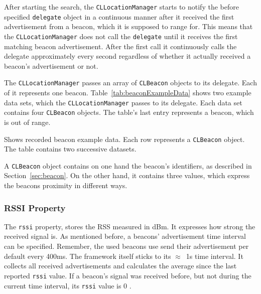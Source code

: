After starting the search, the \texttt{CLLocationManager} starts to notify the before specified \texttt{delegate} object in a continuous manner after it received the first advertisement from a beacon, which it is supposed to range for. This means that the \texttt{CLLocationManager} does not call the \texttt{delegate} until it receives the first matching beacon advertisement. After the first call it continuously calls the delegate approximately every second regardless of whether it actually received a beacon's advertisement or not.

The \texttt{CLLocationManager} passes an array of \texttt{CLBeacon} objects to its delegate. Each of it represents one beacon. Table~\ref{tab:beaconExampleData} shows two example data sets, which the \texttt{CLLocationManager} passes to its delegate. Each data set contains four \texttt{CLBeacon} objects. The table's last entry represents a beacon, which is out of range.

\begin{table}
	
	\caption{Shows recorded beacon example data. Each row represents a \texttt{CLBeacon} object. The table contains two successive datasets.}
	\label{tab:beaconExampleData}
\end{table}

A \texttt{CLBeacon} object contains on one hand the beacon's identifiers, as described in Section~\ref{sec:beacon}. On the other hand, it contains three values, which express the beacons proximity in different ways.

\subsubsection*{\acs{RSSI} Property}
The \texttt{rssi} property, stores the \acl{RSS} measured in dBm. It expresses how strong the received signal is. As mentioned before, a beacons' advertisement time interval can be specified. Remember, the used beacons use send their advertisement per default every 400ms. The framework itself sticks to its $\approx$~1s time interval. It collects all received advertisements and calculates the average since the last reported \texttt{rssi} value. If a beacon's signal was received before, but not during the current time interval, its \texttt{rssi} value is 0 \citep{apple:wwdc_2013_bruins,apple:ios_doc_cl}.

